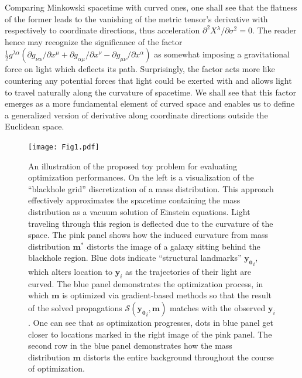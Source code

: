 \documentclass[conference]{IEEEtran}
\begin{document}
Comparing Minkowski spacetime with curved ones, one shall see 
that the flatness of the former leads to the vanishing of the metric tensor's derivative 
with respectively to coordinate directions, thus acceleration
$\partial^2X^\lambda / \partial\sigma^2 = 0$. The reader hence may recognize the 
significance of the factor 
$\frac{1}{2} g^{\lambda\alpha} \left( \partial g_{\nu\alpha} / \partial x^\mu
+\partial g_{\alpha\mu} / \partial x^\nu
-\partial g_{\mu\nu} / \partial x^\alpha\right)$ as somewhat imposing a gravitational 
force on light which deflects its path. Surprisingly, the factor acts more like 
countering any potential forces that light could be exerted with and allows light 
to travel naturally along the curvature of spacetime. We shall see that this factor 
emerges as a more fundamental element of curved space and enables us to define a 
generalized version of derivative along coordinate directions outside the Euclidean space. 

\begin{figure}[htbp]
\centering
\texttt{[image: Fig1.pdf]}
\caption{An illustration of the proposed toy problem for evaluating 
optimization performances. On the left is a visualization of the 
“blackhole grid” discretization of a mass distribution. 
This approach effectively approximates the spacetime containing the mass distribution
as a vacuum solution of Einstein 
equations. Light traveling through this region is deflected due to 
the curvature of the space. The pink panel shows how the induced 
curvature from mass distribution $\mathbf{m}^*$ distorts the image 
of a galaxy sitting behind the blackhole region. Blue dots indicate 
“structural landmarks” $\mathbf{y_0}_i$, which alters location to 
$\mathbf{y}_i$ as the trajectories of their light are curved. 
The blue panel demonstrates the optimization process, in which 
$\mathbf{m}$ is optimized via gradient-based methods so that the 
result of the solved propagations $\mathcal{S}(\mathbf{y_0}_i, \mathbf{m})$ 
matches with the observed $\mathbf{y}_i$. One can see that as 
optimization progresses, dots in blue panel get closer to locations 
marked in the right image of the pink panel. The second row in the blue 
panel demonstrates how the mass distribution $\mathbf{m}$ distorts the 
entire background throughout the course of optimization. }
\label{fig}
\end{figure}
\end{document}

